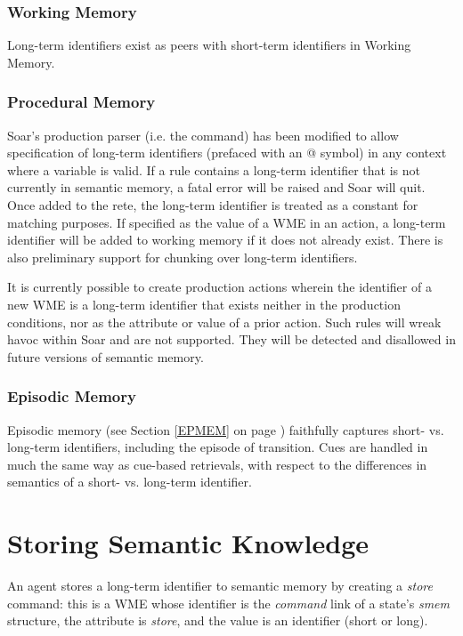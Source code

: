 \subsubsection{Working Memory}
Long-term identifiers exist as peers with short-term identifiers in Working Memory.

\subsubsection{Procedural Memory}
Soar's production parser (i.e. the  command) has been modified to allow specification of long-term identifiers (prefaced with an {@} symbol) in any context where a variable is valid.
If a rule contains a long-term identifier that is not currently in semantic memory, a fatal error will be raised and Soar will quit.  
Once added to the rete, the long-term identifier is treated as a constant for matching purposes.  
If specified as the value of a WME in an action, a long-term identifier will be added to working memory if it does not already exist.  
There is also preliminary support for chunking over long-term identifiers.

It is currently possible to create production actions wherein the identifier of a new WME is a long-term identifier that exists neither in the production conditions, nor as the attribute or value of a prior action.  
Such rules will wreak havoc within Soar and are not supported.  
They will be detected and disallowed in future versions of semantic memory.

\subsubsection{Episodic Memory}
Episodic memory (see Section \ref{EPMEM} on page \pageref{EPMEM}) faithfully captures short- vs. long-term identifiers, including the episode of transition.  
Cues are handled in much the same way as cue-based retrievals, with respect to the differences in semantics of a short- vs. long-term identifier.

\section{Storing Semantic Knowledge}
\label{SMEM-store}

An agent stores a long-term identifier to semantic memory by creating a \emph{store} command: this is a WME whose identifier is the \emph{command} link of a state's \emph{smem} structure, the attribute is \emph{store}, and the value is an identifier (short or long).

